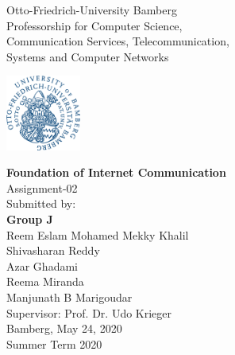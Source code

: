 
\thispagestyle{empty}
\begin{center}
\begin{minipage}{0.7\textwidth}
\centering
\footnotesize{Otto-Friedrich-University Bamberg}\\
	\vspace{0.3cm}
\normalsize{Professorship for Computer Science,
	\\Communication Services, Telecommunication,
 	\\Systems and Computer Networks}
\end{minipage}
\begin{minipage}{0.1\textwidth}\raggedleft
\includegraphics[width=70pt]{Images/UMI-LOGO.png}
\end{minipage}




	


	\vspace{1cm}
	\doublespacing
	{\textbf{Foundation of Internet Communication}}\\
	\singlespacing
	{\normalsize{Assignment-02}}\\
    \vfill
    \footnotesize{Submitted by:}\\
    \textbf{Group J}\\
    \vspace{0.5cm}
     \normalsize{Reem Eslam Mohamed Mekky Khalil}\\
      \normalsize{Shivasharan Reddy}\\
     \normalsize{Azar Ghadami}\\
     \normalsize{Reema Miranda}\\
     \normalsize{Manjunath B Marigoudar}\\

     \vspace{0.5cm}
     \small{Supervisor: Prof. Dr. Udo Krieger}\\
     \vspace{0.5cm}
     \footnotesize{Bamberg, May 24, 2020}\\
    \footnotesize{Summer Term 2020}
 

 
\end{center}
\clearpage

\clearpage
